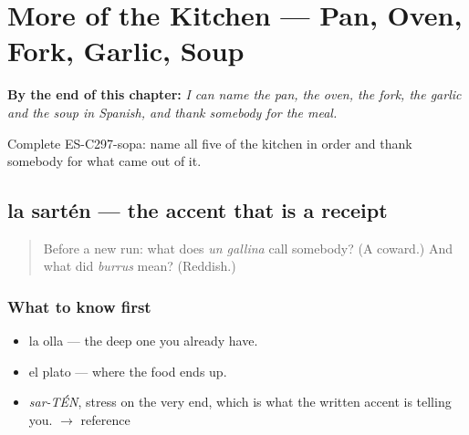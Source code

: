 
\chapter{More of the Kitchen --- Pan, Oven, Fork, Garlic, Soup}
\label{ch:la-cocina}

\begin{chapteropening}
\textbf{By the end of this chapter:} \emph{I can name the pan, the oven, the fork, the garlic and the soup in Spanish, and thank somebody for the meal.}

Complete ES-C297-sopa: name all five of the kitchen in order and thank somebody for what came out of it.
\end{chapteropening}

\section[la sartén]{la sartén — the accent that is a receipt}

\label{lesson:ES-C297-sarten}



\begin{quote}
Before a new run: what does \emph{un gallina} call somebody? (A coward.) And what did \emph{burrus} mean? (Reddish.)
\end{quote}

\subsection*{What to know first}
\begin{itemize}
\raggedright
  \item la olla — the deep one you already have.
  \item el plato — where the food ends up.
\end{itemize}

\begin{sounds}
\begin{itemize}
\raggedright
  \item \emph{sar-TÉN}, stress on the very end, which is what the written accent is telling you. $\to$ reference
\end{itemize}
\end{sounds}

